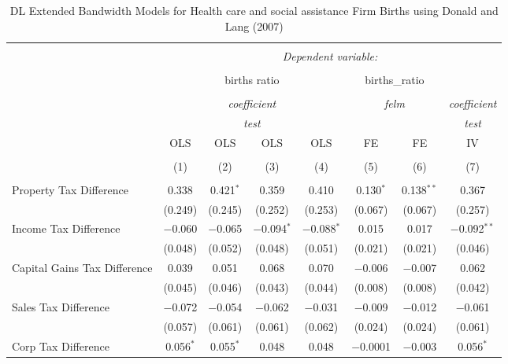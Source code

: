 
\begin{table}[!htbp] \centering 
  \caption{DL Extended Bandwidth Models for  Health care and social assistance Firm Births using Donald and Lang (2007)} 
  \label{} 
\begin{tabular}{@{\extracolsep{5pt}}lccccccc} 
\\[-1.8ex]\hline 
\hline \\[-1.8ex] 
 & \multicolumn{7}{c}{\textit{Dependent variable:}} \\ 
\cline{2-8} 
\\[-1.8ex] & \multicolumn{4}{c}{births ratio} & \multicolumn{2}{c}{births\_ratio} &   \\ 
\\[-1.8ex] & \multicolumn{4}{c}{\textit{coefficient}} & \multicolumn{2}{c}{\textit{felm}} & \textit{coefficient} \\ 
 & \multicolumn{4}{c}{\textit{test}} & \multicolumn{2}{c}{\textit{}} & \textit{test} \\ 
 & OLS & OLS & OLS & OLS & FE & FE & IV \\ 
\\[-1.8ex] & (1) & (2) & (3) & (4) & (5) & (6) & (7)\\ 
\hline \\[-1.8ex] 
 Property Tax Difference & 0.338 & 0.421$^{*}$ & 0.359 & 0.410 & 0.130$^{*}$ & 0.138$^{**}$ & 0.367 \\ 
  & (0.249) & (0.245) & (0.252) & (0.253) & (0.067) & (0.067) & (0.257) \\ 
  Income Tax Difference & $-$0.060 & $-$0.065 & $-$0.094$^{*}$ & $-$0.088$^{*}$ & 0.015 & 0.017 & $-$0.092$^{**}$ \\ 
  & (0.048) & (0.052) & (0.048) & (0.051) & (0.021) & (0.021) & (0.046) \\ 
  Capital Gains Tax Difference & 0.039 & 0.051 & 0.068 & 0.070 & $-$0.006 & $-$0.007 & 0.062 \\ 
  & (0.045) & (0.046) & (0.043) & (0.044) & (0.008) & (0.008) & (0.042) \\ 
  Sales Tax Difference & $-$0.072 & $-$0.054 & $-$0.062 & $-$0.031 & $-$0.009 & $-$0.012 & $-$0.061 \\ 
  & (0.057) & (0.061) & (0.061) & (0.062) & (0.024) & (0.024) & (0.061) \\ 
  Corp Tax Difference & 0.056$^{*}$ & 0.055$^{*}$ & 0.048 & 0.048 & $-$0.0001 & $-$0.003 & 0.056$^{*}$ \\ 

\end{tabular}
\end{table}
